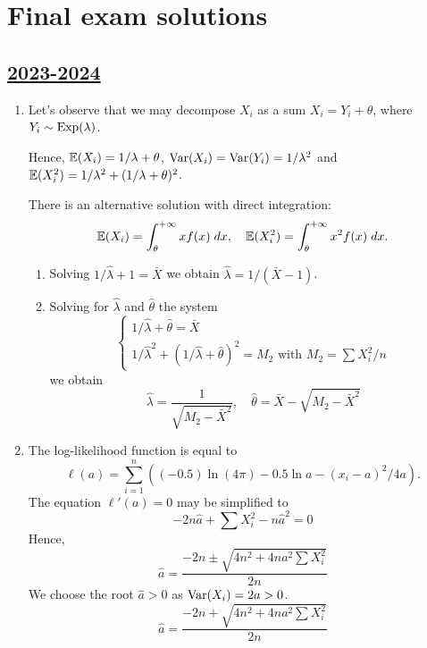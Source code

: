 
\newpage
\thispagestyle{empty}
\section{Final exam solutions}


\subsection[2023-2024]{\hyperref[sec:kr_04_2023_2024]{2023-2024}}
\label{sec:sol_kr_04_2023_2024} %



\begin{enumerate}

\item Let's observe that we may decompose $X_i$ as a sum $X_i = Y_i + \theta$,
where $Y_i \sim \mathrm{Exp}(\lambda)$. 

Hence, $\operatorname{\mathbb{E}}(X_i) = 1/\lambda + \theta$, $\operatorname{Var}(X_i) = \operatorname{Var}(Y_i) = 1/\lambda^2$
and $\operatorname{\mathbb{E}}(X_i^2) = 1/\lambda^2 + (1/\lambda + \theta)^2$.

There is an alternative solution with direct integration:
\[
\operatorname{\mathbb{E}}(X_i) = \int_{\theta}^{+\infty} x f(x) \; dx, \quad \operatorname{\mathbb{E}}(X_i^2) = \int_{\theta}^{+\infty} x^2 f(x) \; dx.
\]

\begin{enumerate}
    \item Solving $1/\hat\lambda + 1 = \bar X$ we obtain $\hat\lambda = 1/ (\bar X - 1)$.
    \item Solving for $\hat\lambda$ and $\hat\theta$ the system
\[
\begin{cases}
    1/\hat\lambda + \hat \theta = \bar X \\
    1/\hat\lambda^2 + (1/\hat\lambda + \hat\theta)^2 = M_2 \text{ with } M_2 = \sum X_i^2/n
\end{cases}    
\]
we obtain 
\[
\hat \lambda = \frac{1}{\sqrt{M_2 - \bar X^2}} , \quad \hat \theta =  \bar X - \sqrt{M_2 - \bar X^2}   
\]
\end{enumerate}

\item The log-likelihood function is equal to
\[
\ell(a) = \sum_{i=1}^n \left( (-0.5)\ln(4\pi) - 0.5 \ln a - (x_i - a)^2 / 4a \right).
\]
The equation $\ell'(a) = 0$ may be simplified to
\[
-2n\hat a + \sum X_i^2 - n\hat a^2 = 0    
\]
Hence, 
\[
\hat a = \frac{-2n \pm \sqrt{4 n^2 + 4na^2 \sum X_i^2}}{2n}
\]
We choose the root $\hat a > 0$ as $\operatorname{Var}(X_i) = 2a > 0$.
\[
\hat a = \frac{-2n + \sqrt{4 n^2  + 4na^2 \sum X_i^2}}{2n}    
\]


\end{enumerate}
